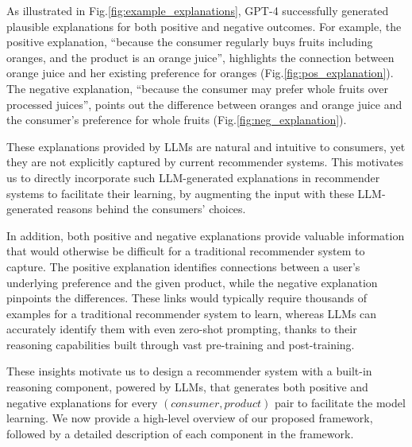 As illustrated in Fig.\ref{fig:example_explanations}, GPT-4 successfully generated plausible explanations for both positive and negative outcomes. For example, the positive explanation, ``because the consumer regularly buys fruits including oranges, and the product is an orange juice'', highlights the connection between orange juice and her existing preference for oranges (Fig.\ref{fig:pos_explanation}). The negative explanation, ``because the consumer may prefer whole fruits over processed juices'', points out the difference between oranges and orange juice and the consumer's preference for whole fruits (Fig.\ref{fig:neg_explanation}). %

These explanations provided by LLMs are natural and intuitive to consumers, yet they are not explicitly captured by current recommender systems. This motivates us to directly incorporate such LLM-generated explanations in recommender systems to facilitate their learning, by augmenting the input with these LLM-generated reasons behind the consumers' choices. 

In addition, both positive and negative explanations provide valuable information that would otherwise be difficult for a traditional recommender system to capture. The positive explanation identifies connections between a user's underlying preference and the given product, while the negative explanation pinpoints the differences. These links would typically require thousands of examples for a traditional recommender system to learn, whereas LLMs can accurately identify them with even zero-shot prompting, thanks to their reasoning capabilities built through vast pre-training and post-training.
  


These insights motivate us to design a recommender system with a built-in reasoning component, powered by LLMs, that generates both positive and negative explanations for every $(consumer, product)$ pair to facilitate the model learning. We now provide a high-level overview of our proposed framework, followed by a detailed description of each component in the framework.


